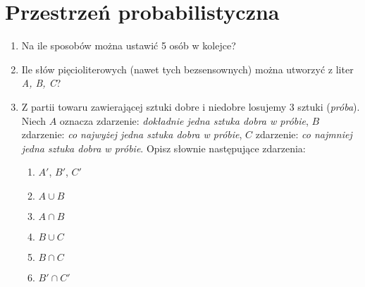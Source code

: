 \documentclass[twoside]{mwart}
\newcommand{\ans}[1]{}
\newcommand{\ans}[1]{\par\emph{Odpowiedź:} #1}
\begin{document}
\section{Przestrzeń probabilistyczna}

\begin{enumerate}
\item Na ile sposobów można ustawić 5 osób w kolejce? \ans{$5!$}
\item Ile słów pięcioliterowych (nawet tych bezsensownych) można utworzyć z liter \emph{A, B, C}? \ans{$3^5=243$}
\item Z partii towaru zawierającej sztuki dobre i niedobre losujemy 3 sztuki (\emph{próba}). Niech $A$ oznacza zdarzenie: \emph{dokładnie jedna sztuka dobra w próbie}, $B$ zdarzenie: \emph{co najwyżej jedna sztuka dobra w próbie}, $C$ zdarzenie: \emph{co najmniej jedna sztuka dobra w próbie}. Opisz słownie następujące zdarzenia:
\begin{enumerate}
\item $A'$, $B'$, $C'$
\item $A\cup B$
\item $A\cap B$
\item $B\cup C$
\item $B\cap C$
\item $B'\cap C'$
\end{enumerate}
\ans{
	W próbie może być (dokładnie) 0, 1, 2 lub 3 sztuki dobre. Zatem:
	\begin{enumerate}
		\item 
		\begin{itemize}
			\item $A'$ Ze wszystkich możliwości usuwamy odpowiedź 1 sztuka dobra, uzyskując: \emph{0 lub 2 lub 3 sztuki dobre w próbie}. Uwaga, odpowiedź \emph{Dokładnie 1 sztuka zła w próbie} nie jest poprawna, bo to znaczy to samo co \emph{dokładnie 2 sztuki dobre w próbie}, a to jest tylko jedna z pozostałych możliwości.
			\item $B'$  Ze wszystkich możliwości usuwamy odpowiedzi 0 i 1 sztuk dobrych, uzyskując: \emph{2 lub 3 sztuki dobre w próbie}.
			\item $C'$  Ze wszystkich możliwości usuwamy odpowiedzi 1, 2, 3 sztuki dobre, uzyskując: \emph{0 sztuk dobrych w próbie}.

\end{itemize}
\end{enumerate}}
\end{enumerate}
\end{document}
